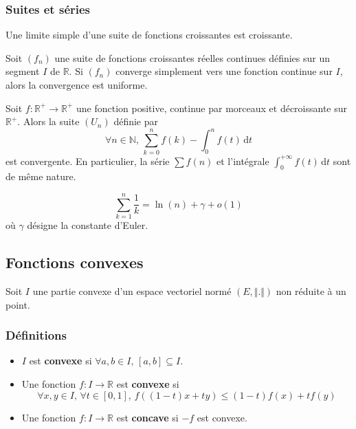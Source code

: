   \subsubsection{Suites et séries}


  \begin{lemma}
    Une limite simple d'une suite de fonctions croissantes est croissante.
  \end{lemma}

  \begin{theorem}
    Soit $(f_n)$ une suite de fonctions croissantes réelles continues définies sur un segment $I$ de $\mathbb{R}$. Si $(f_n)$ converge simplement vers une fonction continue sur $I$, alors la convergence est uniforme.
  \end{theorem}


  \begin{proposition}
    Soit $f : \mathbb{R}^+ \rightarrow \mathbb{R}^+$ une fonction positive, continue par morceaux et décroissante sur $\mathbb{R}^+$. Alors la suite $(U_n)$ définie par
    \[ \forall n \in \mathbb{N}, \, \sum_{k=0}^n f(k) - \int_0^n f(t) \, \mathrm{d}t \]
    est convergente. En particulier, la série $\sum f(n)$ et l'intégrale $\int_0^{+\infty} f(t) \, \mathrm{d}t$ sont de même nature.
  \end{proposition}

  \begin{application}
    \[ \sum_{k=1}^n \frac{1}{k} = \ln(n) + \gamma + o (1) \]
    où $\gamma$ désigne la constante d'Euler.
  \end{application}

  \subsection{Fonctions convexes}

  Soit $I$ une partie convexe d'un espace vectoriel normé $(E, \Vert . \Vert)$ non réduite à un point.

  \subsubsection{Définitions}


  \begin{definition}
    \label{229-1}
    \begin{itemize}
      \item $I$ est \textbf{convexe} si $\forall a, b \in I, \, [a,b] \subseteq I$.
      \item Une fonction $f : I \rightarrow \mathbb{R}$ est \textbf{convexe} si
      \[ \forall x, y \in I, \, \forall t \in [0,1], \, f((1-t)x + ty) \leq (1-t)f(x) + tf(y) \]
      \item Une fonction $f : I \rightarrow \mathbb{R}$ est \textbf{concave} si $-f$ est convexe.
    \end{itemize}
  \end{definition}

